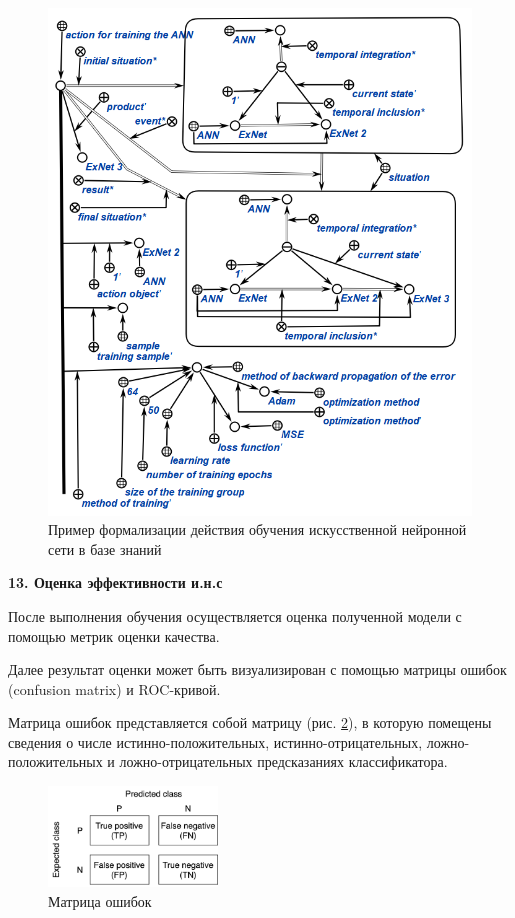 				\begin{figure}
					\centering
					\includegraphics[width=0.9\linewidth]{author/part3/figures/ann_trainning_en.png}
					\caption{Пример формализации действия обучения искусственной нейронной сети в базе знаний \cite{Kovalev2022}}
					\label{fig:ann_trainning_scg}
				\end{figure}
				
				\textbf{13. Оценка эффективности и.н.с}
				
				После выполнения обучения осуществляется оценка полученной модели с помощью метрик оценки качества.
				
				Далее результат оценки может быть визуализирован с помощью матрицы ошибок (confusion matrix) и ROC-кривой.
				
				Матрица ошибок представляется собой матрицу (рис. \ref{fig:conf_matrix}), в которую помещены сведения о числе истинно-положительных, истинно-отрицательных, ложно-положительных и ложно-отрицательных предсказаниях классификатора.
				
				\begin{figure}[h]
					\centering
					\includegraphics[width=0.4\textwidth]{author/part3/figures/conf_matrix.png}
					\caption{Матрица ошибок}
					\label{fig:conf_matrix}
				\end{figure}
				

